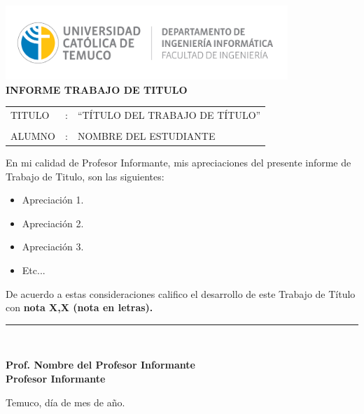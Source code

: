 \begin{center}
\vspace*{-9\baselineskip}
\hspace*{-0.1\textwidth}
\includegraphics[width=0.8\textwidth]{images/Logo_depto_ing_informatica.png}\nonumber\\
\textbf{INFORME  TRABAJO  DE TITULO}
\par\end{center}

\newcommand{\SubItem}[1]{
    {\setlength\itemindent{15pt} \item[-] #1}
}
\vspace{0.8cm}

\begin{tabular}{>{\raggedright}p{}>{\raggedright}p{}>{\raggedright}p{}}
TITULO & : & ``TÍTULO DEL TRABAJO DE TÍTULO''\tabularnewline
 &  & \tabularnewline
ALUMNO & : & NOMBRE DEL ESTUDIANTE\tabularnewline
\end{tabular}

\vspace{1cm}

En mi calidad de Profesor Informante, mis apreciaciones del presente informe de Trabajo de Titulo, son las siguientes:
\begin{itemize}
    \item Apreciación 1.
    \item Apreciación 2. 
    \item Apreciación 3.
    \item Etc...
\end{itemize}

De acuerdo a estas consideraciones califico el desarrollo de este Trabajo de Título con \textbf{nota X,X  (nota en letras).}

\vspace{1cm}

\begin{flushright}
\rule{65mm}{0.2mm}\\
\end{flushright} 
\vspace*{-0.1in}  
\hspace*{2.8in} \textbf{Prof. Nombre del Profesor Informante} \\ \hspace*{3.2in} \textbf{Profesor Informante}

\vspace{1cm}

Temuco, día de mes de año.
